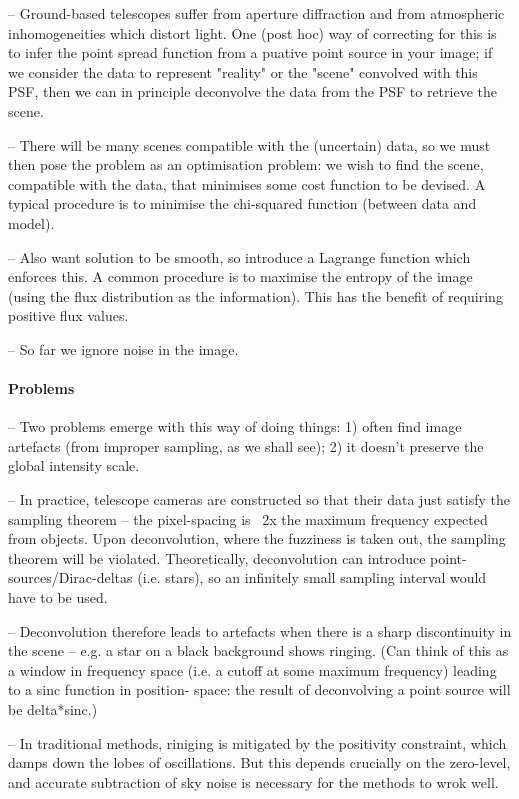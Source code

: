 \documentclass[letterpaper, 11pt]{article}
\begin{document}
-- Ground-based telescopes suffer from aperture diffraction and from atmospheric inhomogeneities which distort light. One (post hoc) way of 
correcting for this is to infer the point spread function from a puative point source in your image; if we consider the data to represent 
"reality" or the "scene" convolved with this PSF, then we can in principle deconvolve the data from the PSF to retrieve the scene. 

-- There will be many scenes compatible with the (uncertain) data, so we must then pose the problem as an optimisation problem: we wish to 
find the scene, compatible with the data, that minimises some cost function to be devised. A typical procedure is to minimise the chi-squared 
function (between data and model).

-- Also want solution to be smooth, so introduce a Lagrange function which enforces this. A common procedure is to maximise the entropy of the 
image (using the flux distribution as the information). This has the benefit of requiring positive flux values.

-- So far we ignore noise in the image.

\paragraph{Problems}

-- Two problems emerge with this way of doing things: 1) often find image artefacts (from improper sampling, as we shall see); 2) it doesn't 
preserve the global intensity scale.

-- In practice, telescope cameras are constructed so that their data just satisfy the sampling theorem -- the pixel-spacing is ~2x the maximum 
frequency expected from objects. Upon deconvolution, where the fuzziness is taken out, the sampling theorem will be violated. Theoretically, 
deconvolution can introduce point-sources/Dirac-deltas (i.e. stars), so an infinitely small sampling interval would have to be used.

-- Deconvolution therefore leads to artefacts when there is a sharp discontinuity in the scene -- e.g. a star on a black background shows 
ringing. (Can think of this as a window in frequency space (i.e. a cutoff at some maximum frequency) leading to a sinc function in position-
space: the result of deconvolving a point source will be delta*sinc.)

-- In traditional methods, riniging is mitigated by the positivity 
constraint, which damps down the lobes of oscillations. But this depends crucially on the zero-level, and accurate subtraction of sky noise 
is necessary for the methods to wrok well.
\end{document}
